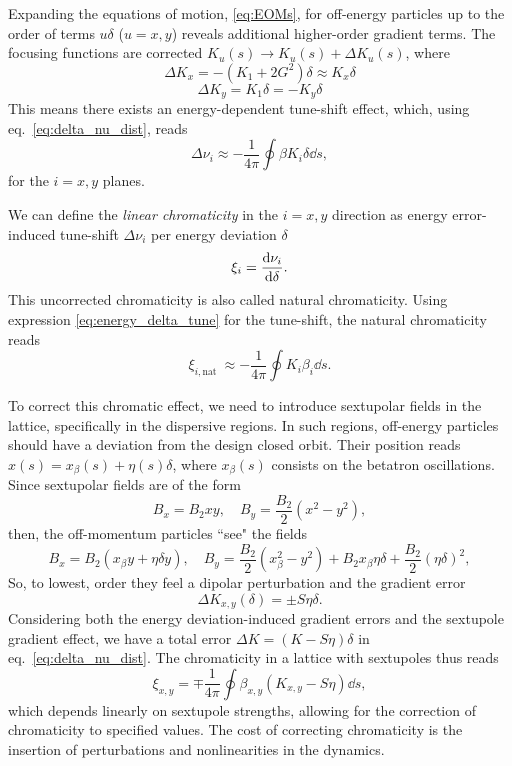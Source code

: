 Expanding the equations of motion, \eqref{eq:EOMs}, for off-energy particles up to the order of terms $u\delta$ ($u=x,y$) reveals additional higher-order gradient terms. The focusing functions are corrected $K_u(s)\to K_u(s) + \Delta K_u(s)$, where
\begin{equation}
    \Delta K_x = -(K_1+2G^2)\delta \approx K_x\delta
\end{equation}
\begin{equation}
    \Delta K_y = K_1\delta = -K_y\delta
\end{equation}
This means there exists an energy-dependent tune-shift effect, which, using eq.~\eqref{eq:delta_nu_dist}, reads
\begin{equation}
    \Delta \nu _i \approx -\frac{1}{4\pi}\oint\beta K_i \delta \dd{s},
    \label{eq:energy_delta_tune}
\end{equation}
for the $i=x,y$ planes.

We can define the \textit{linear chromaticity} in the $i=x,y$ direction as energy error-induced tune-shift $\Delta \nu_i$ per energy deviation $\delta$
\begin{equation}
    \xi_i=\dv{\nu_i}{\delta}.
\end{equation}
This uncorrected chromaticity is also called natural chromaticity. Using expression \eqref{eq:energy_delta_tune} for the tune-shift, the natural chromaticity reads
\begin{equation}
\xi_{i, \text {nat }} \approx-\frac{1}{4 \pi} \oint K_i \beta_i \dd{s}.
\end{equation}

To correct this chromatic effect,  we need to introduce sextupolar fields in the lattice, specifically in the dispersive regions. In such regions, off-energy particles should have a deviation from the design closed orbit. Their position reads $x(s)=x_{\beta}(s)+\eta(s) \delta$, where $x_{\beta}(s)$ consists on the betatron oscillations. Since sextupolar fields are of the form
$$B_{x}=B_{2} x y, \quad B_{y}= \frac{B_{2}}{2}(x^{2}-y^{2}),$$
then, the off-momentum particles ``see" the fields
$$B_{x}=B_{2}(x_\beta y + \eta \delta y), \quad B_{y}=\frac{B_{2}}{2}({x_\beta^{2}-y^{2}})+B_2 x_\beta \eta \delta + \frac{B_2}{2}(\eta \delta)^2,$$
So, to lowest, order they feel a dipolar perturbation and the gradient error
$$\Delta K_{x,y}(\delta)=\pm S\eta \delta.$$
Considering both the energy deviation-induced gradient errors and the sextupole gradient effect, we have a total error $\Delta K = (K - S\eta)\delta$ in eq.~\eqref{eq:delta_nu_dist}. The chromaticity in a lattice with sextupoles thus reads
\begin{equation*}
    \xi_{x,y}=\mp \frac{1}{4\pi}\oint\beta_{x,y}(K_{x,y}- S\eta)\dd s,
\end{equation*}
which depends linearly on sextupole strengths, allowing for the correction of chromaticity to specified values. The cost of correcting chromaticity is the insertion of perturbations and nonlinearities in the dynamics.

